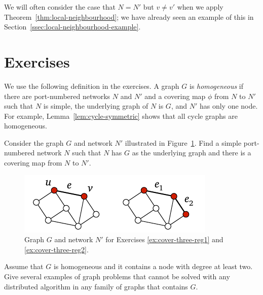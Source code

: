 We will often consider the case that $N = N'$ but $v \ne v'$ when we apply Theorem~\ref{thm:local-neighbourhood}; we have already seen an example of this in Section~\ref{ssec:local-neighbourhood-example}.


\section{Exercises}

We use the following definition in the exercises. A graph $G$ is \emph{homogeneous} if there are port-numbered networks $N$ and $N'$ and a covering map $\phi$ from $N$ to $N'$ such that $N$ is simple, the underlying graph of $N$ is $G$, and $N'$ has only one node. For example, Lemma~\ref{lem:cycle-symmetric} shows that all cycle graphs are homogeneous.

\begin{ex}\label{ex:cover-three-reg1}
    Consider the graph $G$ and network $N'$ illustrated in Figure~\ref{fig:cover-ex-three-reg}. Find a simple port-numbered network $N$ such that $N$ has $G$ as the underlying graph and there is a covering map from $N$ to $N'$.

    \begin{figure}
        \centering
        \includegraphics[page=\PCoverExThreeReg]{figs.pdf}
        \caption{Graph $G$ and network $N'$ for Exercises \ref{ex:cover-three-reg1} and \ref{ex:cover-three-reg2}.}\label{fig:cover-ex-three-reg}
    \end{figure}
\end{ex}

\begin{ex}[homogeneity]
    Assume that $G$ is homogeneous and it contains a node with degree at least two. Give several examples of graph problems that cannot be solved with any distributed algorithm in any family of graphs that contains $G$.
\end{ex}

